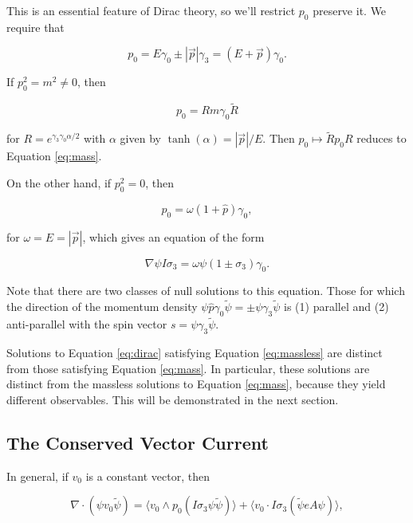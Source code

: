 \documentclass{article}
\begin{document}
  This is an essential feature of Dirac theory, so we'll restrict $p_0$ preserve it. We require that

  \begin{equation}
    p_0 = E \gamma_0 \pm |\vec p| \gamma_3 = (E + \vec p) \gamma_0.
  \end{equation} 

  If $p_0^2 = m^2 \not= 0$, then 

  \begin{equation}
    p_0 = R m \gamma_0 \widetilde R
  \end{equation} 

   for $R = e^{\gamma_3 \gamma_0 \alpha/2}$ with $\alpha$ given by $\tanh(\alpha) = |\vec p|/E$. Then $p_0 \mapsto \widetilde R p_0 R$ reduces to Equation \ref{eq:mass}.

  On the other hand, if $p_0^2 = 0$, then

  \begin{equation}
    p_0 = \omega (1 + \hat p) \gamma_0, \label{eq:massless}
  \end{equation}

  for $\omega = E = |\vec p|$, which gives an equation of the form

  \begin{equation}
    \nabla \psi I \sigma_3 = \omega \psi (1 \pm \sigma_3) \gamma_0.\label{eq:extension}
  \end{equation}

  Note that there are two classes of null solutions to this equation. Those for which the direction of the momentum density $\psi \hat p \gamma_0 \widetilde \psi = \pm \psi \gamma_3 \widetilde \psi$ is (1) parallel and (2) anti-parallel with the spin vector $s = \psi \gamma_3 \widetilde \psi$.

  Solutions to Equation \ref{eq:dirac} satisfying Equation \ref{eq:massless} are distinct from those satisfying Equation \ref{eq:mass}. In particular, these solutions are distinct from the massless solutions to Equation \ref{eq:mass}, because they yield different observables. This will be demonstrated in the next section.

  \subsection{The Conserved Vector Current}

  In general, if $v_0$ is a constant vector, then

  \begin{equation}
    \nabla \cdot (\psi v_0 \widetilde \psi) = \langle v_0 \wedge p_0 (I \sigma_3 \psi \widetilde \psi) \rangle + \langle v_0 \cdot I \sigma_3 (\widetilde \psi e A \psi) \rangle,
  \end{equation}
\end{document}
